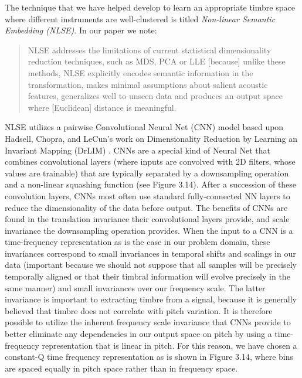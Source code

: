 \documentclass[a4paper,12pt]{report} 	%
\numberwithin{figure}{chapter}
\numberwithin{table}{chapter}
\numberwithin{equation}{chapter}
\begin{document}
\begin{flushleft}
The technique that we have helped develop to learn an appropriate timbre space where different instruments are well-clustered is titled \emph{Non-linear Semantic Embedding (NLSE)}. In our paper we note:
\begin{quote}
NLSE addresses the limitations of current statistical dimensionality reduction techniques, such as MDS, PCA or LLE [because] unlike these methods, NLSE explicitly encodes semantic information in the transformation, makes minimal assumptions about salient acoustic features, generalizes well to unseen data and produces an output space where [Euclidean] distance is meaningful.
\end{quote}

NLSE utilizes a pairwise Convolutional Neural Net (CNN) model based upon Hadsell, Chopra, and LeCun's work on Dimensionality Reduction by Learning an Invariant Mapping (DrLIM) \cite{hadsell2006dimensionality}. CNNs are a special kind of Neural Net that combines convolutional layers (where inputs are convolved with 2D filters, whose values are trainable) that are typically separated by a downsampling operation and a non-linear squashing function (see Figure 3.14). After a succession of these convolution layers, CNNs most often use standard fully-connected NN layers to reduce the dimensionality of the data before output. The benefits of CNNs are found in the translation invariance their convolutional layers provide, and scale invariance the downsampling operation provides. When the input to a CNN is a time-frequency representation as is the case in our problem domain, these invariances correspond to small invariances in temporal shifts and scalings in our data (important because we should not suppose that all samples will be precisely temporally aligned or that their timbral information will evolve precisely in the same manner) and small invariances over our frequency scale. The latter invariance is important to extracting timbre from a signal, because it is generally believed that timbre does not correlate with pitch variation. It is therefore possible to utilize the inherent frequency scale invariance that CNNs provide to better eliminate any dependencies in our output space on pitch by using a time-frequency representation that is linear in pitch. For this reason, we have chosen a constant-Q time frequency representation as is shown in Figure 3.14, where bins are spaced equally in pitch space rather than in frequency space.


\end{flushleft}
\end{document}
